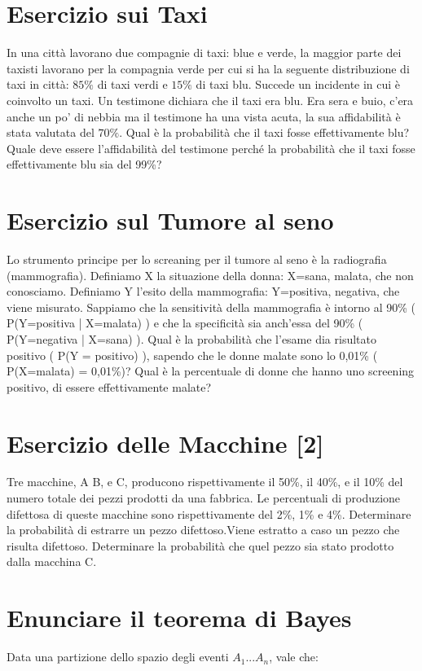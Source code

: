 \documentclass[\main/main.tex]{subfiles}
\begin{document}
\section{Esercizio sui Taxi}
In una città lavorano due compagnie di taxi: blue e verde, la maggior parte dei taxisti lavorano per la compagnia verde per cui si ha la seguente distribuzione di taxi in città: $85\%$ di taxi verdi e $15\%$ di taxi blu. Succede un incidente in cui è coinvolto un taxi. Un testimone dichiara che il taxi era blu. Era sera e buio, c'era anche un po' di nebbia ma il testimone ha una vista acuta, la sua affidabilità è stata valutata del $70\%$. Qual è la probabilità che il taxi fosse effettivamente blu? Quale deve essere l'affidabilità del testimone perché la probabilità che il taxi fosse effettivamente blu sia del 99\%? 

\section{Esercizio sul Tumore al seno}
Lo strumento principe per lo screaning per il tumore al seno è la radiografia (mammografia). Definiamo X la situazione della donna: X={sana, malata}, che non conosciamo. Definiamo Y l'esito della mammografia: Y={positiva, negativa}, che viene misurato. Sappiamo che la sensitività della mammografia è intorno al 90\% ( P(Y=positiva | X=malata) ) e che la specificità sia anch'essa del 90\% ( P(Y=negativa | X=sana) ). Qual è la probabilità che l'esame dia risultato positivo ( P(Y = positivo) ), sapendo che le donne malate sono lo 0,01\% ( P(X=malata) = 0,01\%)? Qual è la percentuale di donne che hanno uno screening positivo, di essere effettivamente malate?

\section{Esercizio delle Macchine [2]}
Tre macchine, A B, e C, producono rispettivamente il 50\%, il 40\%, e il 10\% del numero totale dei pezzi prodotti da una fabbrica. Le percentuali di produzione difettosa di queste macchine sono rispettivamente del 2\%, 1\% e 4\%. Determinare la probabilità di estrarre un pezzo difettoso.Viene estratto a caso un pezzo che risulta difettoso. Determinare la probabilità che quel pezzo sia stato prodotto dalla macchina C.

\section{Enunciare il teorema di Bayes}
Data una partizione dello spazio degli eventi $A_1...A_n$, vale che:
\end{document}
